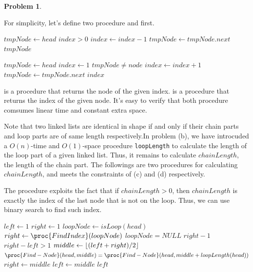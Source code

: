 \documentclass[12pt,a4paper]{report}
\newcommand{\get}{\leftarrow}
\theoremstyle{definition}
\newtheorem{problem}{\textbf{Problem}}
\theoremstyle{definition}
\DeclarePairedDelimiter\floor{\lfloor}{\rfloor}
\begin{document}
\begin{problem}
\begin{enumerate}[label=\arabic*.]
\begin{enumerate}[label=\alph*.]
    For simplicity, let's define two procedure  and  first.
\begin{codebox}
\li $tmpNode\get head$
\li \While $index>0$\Do
\li     $index\get index-1$
\li     $tmpNode\get tmpNode.next$
    \End
\li \Return $tmpNode$
\end{codebox}
\begin{codebox}
\li $tmpNode\get head$
\li $index\get 1$
\li \While $tmpNode\neq node$\Do
\li     $index\get index+1$
\li     $tmpNode\get tmpNode.next$
    \End
\li \Return $index$
\end{codebox}

 is a procedure that returns the node of the given index.  is a procedure that returns the index of the given node. It's easy to verify that both procedure comsumes linear time and constant extra space.

Note that two linked lists are identical in shape if and only if their chain parts and loop parts are of same length respectively.In problem (b), we have introcuded a $O(n)$-time and $O(1)$-space procedure \texttt{loopLength} to calculate the length of the loop part of a given linked list. Thus, it remains to calculate $chainLength$, the length of the chain part. The followings are two procedures for calculating $chainLength$, and meets the constraints of (c) and (d) respectively.

The procedure  exploits the fact that if $chainLength>0$, then $chainLength$ is exactly the index of the last node that is not on the loop. Thus, we can use binary search to find such index.

\begin{codebox}
\li $left\get 1$
\li $right\get 1$
\li $loopNode\get isLoop(head)$
\li $right\get \proc{FindIndex}(loopNode)$
\li \If $loopNode=NULL$ \Then
\li     \Return $right-1$
    \End
\li \While $right-left>1$ \Do
\li     $middle\get \floor{(left+right)/2}$
\li     \If $\proc{Find-Node}(head,middle)=\proc{Find-Node}(head,middle+loopLength(head))$ \Then
\li         $right\get middle$
\li     \Else
\li         $left\get middle$
        \End
    \End
\li \Return $left$
\end{codebox}

\begin{codebox}


\end{codebox}
\end{enumerate}
\end{enumerate}
\end{problem}
\end{document}
